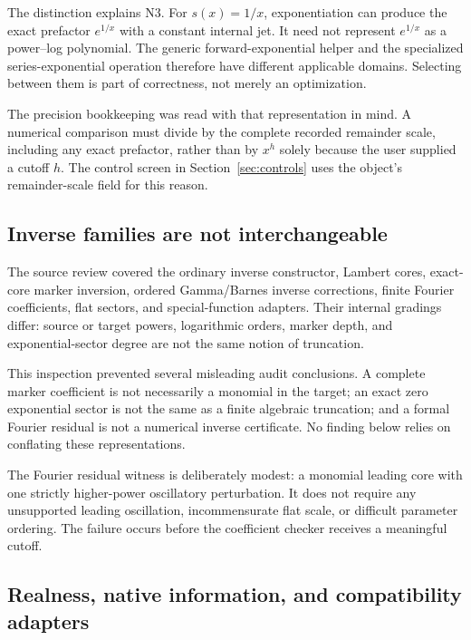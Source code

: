 \documentclass[11pt,letterpaper]{article}
\begin{document}
The distinction explains N3. For $s(x)=1/x$, exponentiation can produce the exact prefactor $e^{1/x}$ with a constant internal jet. It need not represent $e^{1/x}$ as a power--log polynomial. The generic forward-exponential helper and the specialized series-exponential operation therefore have different applicable domains. Selecting between them is part of correctness, not merely an optimization.

The precision bookkeeping was read with that representation in mind. A numerical comparison must divide by the complete recorded remainder scale, including any exact prefactor, rather than by $x^h$ solely because the user supplied a cutoff $h$. The control screen in Section~\ref{sec:controls} uses the object's remainder-scale field for this reason.

\subsection{Inverse families are not interchangeable}

The source review covered the ordinary inverse constructor, Lambert cores, exact-core marker inversion, ordered Gamma/Barnes inverse corrections, finite Fourier coefficients, flat sectors, and special-function adapters. Their internal gradings differ: source or target powers, logarithmic orders, marker depth, and exponential-sector degree are not the same notion of truncation.\cite{main,lambert,core,gammainverse,fourier,flat,adapters}

This inspection prevented several misleading audit conclusions. A complete marker coefficient is not necessarily a monomial in the target; an exact zero exponential sector is not the same as a finite algebraic truncation; and a formal Fourier residual is not a numerical inverse certificate. No finding below relies on conflating these representations.

The Fourier residual witness is deliberately modest: a monomial leading core with one strictly higher-power oscillatory perturbation. It does not require any unsupported leading oscillation, incommensurate flat scale, or difficult parameter ordering. The failure occurs before the coefficient checker receives a meaningful cutoff.

\subsection{Realness, native information, and compatibility adapters}
\end{document}
